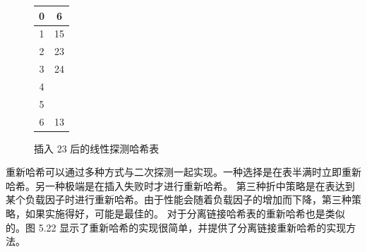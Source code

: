 \documentclass[a4paper]{ctexart}
\theoremstyle{definition}
\theoremstyle{definition}
\begin{document}
\begin{figure}[htbp]
    \centering
    \begin{tabular}{|c|c|}
        \hline
        0 & 6 \\
        \hline
        1 & 15 \\
        \hline
        2 & 23 \\
        \hline
        3 & 24 \\
        \hline
        4 &  \\
        \hline
        5 &  \\
        \hline
        6 & 13 \\
        \hline
    \end{tabular}
    \caption{插入 23 后的线性探测哈希表}
    \label{fig:hash_table_2}
\end{figure}

重新哈希可以通过多种方式与二次探测一起实现。一种选择是在表半满时立即重新哈希。另一种极端是在插入失败时才进行重新哈希。
第三种折中策略是在表达到某个负载因子时进行重新哈希。由于性能会随着负载因子的增加而下降，第三种策略，如果实施得好，可能是最佳的。
对于分离链接哈希表的重新哈希也是类似的。图 5.22 显示了重新哈希的实现很简单，并提供了分离链接重新哈希的实现方法。




\end{document}
